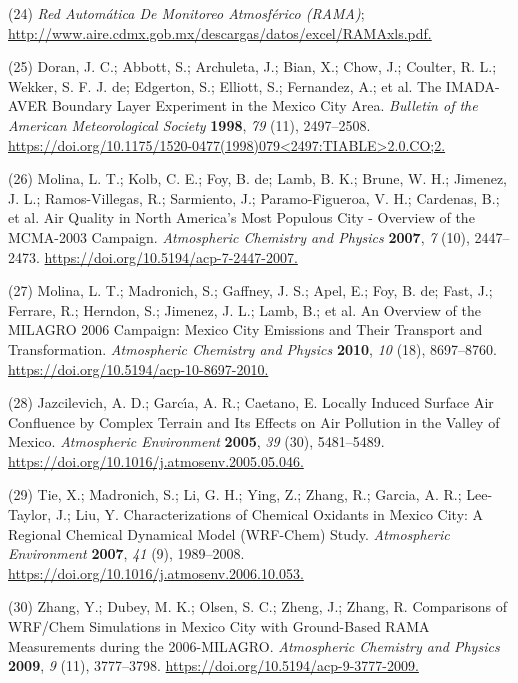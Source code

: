 \documentclass[10pt]{article}
\begin{document}
\label{csl:24}(24) \textit{{Red Automática De Monitoreo Atmosférico (RAMA)}}; \url{http://www.aire.cdmx.gob.mx/descargas/datos/excel/RAMAxls.pdf.}

\label{csl:25}(25) Doran, J. C.; Abbott, S.; Archuleta, J.; Bian, X.; Chow, J.; Coulter, R. L.; Wekker, S. F. J. de; Edgerton, S.; Elliott, S.; Fernandez, A.; et al. {The IMADA-AVER Boundary Layer Experiment in the Mexico City Area}. \textit{Bulletin of the American Meteorological Society} \textbf{1998}, \textit{79} (11), 2497–2508. \url{https://doi.org/10.1175/1520-0477(1998)079<2497:TIABLE>2.0.CO;2.}

\label{csl:26}(26) Molina, L. T.; Kolb, C. E.; Foy, B. de; Lamb, B. K.; Brune, W. H.; Jimenez, J. L.; Ramos-Villegas, R.; Sarmiento, J.; Paramo-Figueroa, V. H.; Cardenas, B.; et al. {Air Quality in North America's Most Populous City - Overview of the {MCMA}-2003 Campaign}. \textit{Atmospheric Chemistry and Physics} \textbf{2007}, \textit{7} (10), 2447–2473. \url{https://doi.org/10.5194/acp-7-2447-2007.}

\label{csl:27}(27) Molina, L. T.; Madronich, S.; Gaffney, J. S.; Apel, E.; Foy, B. de; Fast, J.; Ferrare, R.; Herndon, S.; Jimenez, J. L.; Lamb, B.; et al. {An Overview of the {MILAGRO} 2006 Campaign: Mexico City Emissions and Their Transport and Transformation}. \textit{Atmospheric Chemistry and Physics} \textbf{2010}, \textit{10} (18), 8697–8760. \url{https://doi.org/10.5194/acp-10-8697-2010.}

\label{csl:28}(28) Jazcilevich, A. D.; Garc{\'{\i}}a, A. R.; Caetano, E. {Locally Induced Surface Air Confluence by Complex Terrain and Its Effects on Air Pollution in the Valley of Mexico}. \textit{Atmospheric Environment} \textbf{2005}, \textit{39} (30), 5481–5489. \url{https://doi.org/10.1016/j.atmosenv.2005.05.046.}

\label{csl:29}(29) Tie, X.; Madronich, S.; Li, G. H.; Ying, Z.; Zhang, R.; Garcia, A. R.; Lee-Taylor, J.; Liu, Y. {Characterizations of Chemical Oxidants in Mexico City: A Regional Chemical Dynamical Model ({WRF}-Chem) Study}. \textit{Atmospheric Environment} \textbf{2007}, \textit{41} (9), 1989–2008. \url{https://doi.org/10.1016/j.atmosenv.2006.10.053.}

\label{csl:30}(30) Zhang, Y.; Dubey, M. K.; Olsen, S. C.; Zheng, J.; Zhang, R. {Comparisons of {WRF}/Chem Simulations in Mexico City with Ground-Based {RAMA} Measurements during the 2006-{MILAGRO}}. \textit{Atmospheric Chemistry and Physics} \textbf{2009}, \textit{9} (11), 3777–3798. \url{https://doi.org/10.5194/acp-9-3777-2009.}
\end{document}
